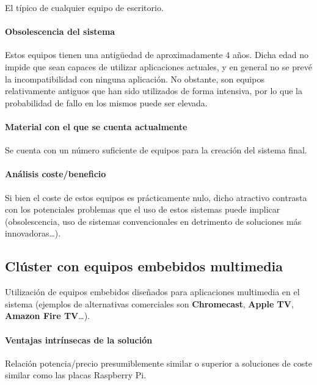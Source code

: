 El típico de cualquier equipo de escritorio.

\paragraph{Obsolescencia del sistema\\}

Estos equipos tienen una antigüedad de aproximadamente 4 años. Dicha edad no impide que sean capaces de utilizar aplicaciones actuales, y en general no se prevé la incompatibilidad con ninguna aplicación. No obstante, son equipos relativamente antiguos que han sido utilizados de forma intensiva, por lo que la probabilidad de fallo en los mismos puede ser elevada.

\paragraph{Material con el que se cuenta actualmente\\}

Se cuenta con un número suficiente de equipos para la creación del sistema final.

\paragraph{Análisis coste/beneficio\\}

Si bien el coste de estos equipos es prácticamente nulo, dicho atractivo contrasta con los potenciales problemas que el uso de estos sistemas puede implicar (obsolescencia, uso de sistemas convencionales en detrimento de soluciones más innovadoras\dots).

\subsection{Clúster con equipos embebidos multimedia}

Utilización de equipos embebidos diseñados para aplicaciones multimedia en el sistema (ejemplos de alternativas comerciales son \textbf{Chromecast}, \textbf{Apple TV}, \textbf{Amazon Fire TV}\dots).

\paragraph{Ventajas intrínsecas de la solución\\}

Relación potencia/precio presumiblemente similar o superior a soluciones de coste similar como las placas Raspberry Pi.

